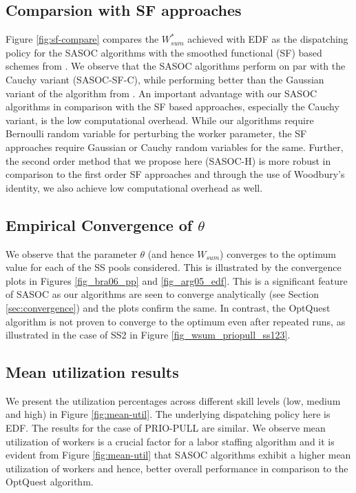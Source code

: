 \documentclass[11pt,letterpaper,english]{article}
\begin{document}
\subsection{Comparsion with SF approaches}
Figure \ref{fig:sf-compare} compares the $W^*_{sum}$ achieved with EDF as the
dispatching policy for the SASOC algorithms with the smoothed functional (SF)
based schemes from \citep{prashanth2011ss}. We observe that the SASOC algorithms
perform on par with the Cauchy variant (SASOC-SF-C), while performing better
than the Gaussian variant of the algorithm from \citep{prashanth2011ss}. An
important advantage with our SASOC algorithms in comparison with the SF based
approaches, especially the Cauchy variant, is the low computational overhead. While
our algorithms require Bernoulli random variable for perturbing the worker
parameter, the SF approaches require Gaussian or Cauchy random variables for
the same. Further, the second order method that we propose here (SASOC-H) is
more robust in comparison to the first order SF approaches and through the use
of Woodbury's identity, we also achieve low computational overhead as well.

\subsection{Empirical Convergence of $\theta$}
We observe that the parameter $\theta$ (and hence $W_{sum}$)
converges to the optimum value for each of the SS pools
considered. This is illustrated by the convergence plots in
Figures \ref{fig_bra06_pp} and \ref{fig_arg05_edf}. This is a
significant feature of SASOC as our algorithms are seen to converge analytically
(see Section \ref{sec:convergence}) and the plots confirm the
same. In contrast, the OptQuest algorithm is not proven to converge to
the optimum even after repeated runs, as illustrated in the case of SS2 in Figure
\ref{fig_wsum_priopull_ss123}.

\subsection{Mean utilization results}
We present the
utilization percentages across different skill levels (low, medium and high) in 
Figure \ref{fig:mean-util}. The underlying dispatching policy here is EDF. The results for the case of PRIO-PULL are similar. We observe mean utilization of workers is a crucial factor for a labor staffing algorithm and it is evident from Figure \ref{fig:mean-util} that SASOC algorithms exhibit a higher mean utilization of workers and hence, better overall performance in comparison to the OptQuest algorithm.
\end{document}

